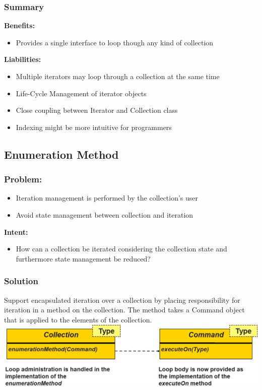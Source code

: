 \subsubsection{Summary}
\textbf{Benefits:}
\begin{itemize}
    \item Provides a single interface to loop though any kind of collection
\end{itemize}
\textbf{Liabilities:}
\begin{itemize}
    \item Multiple iterators may loop through a collection at the same time
    \item Life-Cycle Management of iterator objects
    \item Close coupling between Iterator and Collection class
    \item Indexing might be more intuitive for programmers
\end{itemize}

\subsection{Enumeration Method}
\subsubsection{Problem:}
\begin{itemize}
    \item Iteration management is performed by the collection's user
    \item Avoid state management between collection and iteration
\end{itemize}
\textbf{Intent:}
\begin{itemize}
    \item How can a collection be iterated considering the collection state and furthermore state management be reduced?
\end{itemize}
\subsubsection{Solution}
Support encapsulated iteration over a collection by placing responsibility for iteration in a method on the collection. The method takes a Command object that is applied to the elements of the collection.\\ 
\includegraphics[width=\linewidth]{./img/enumeration_method.png}
